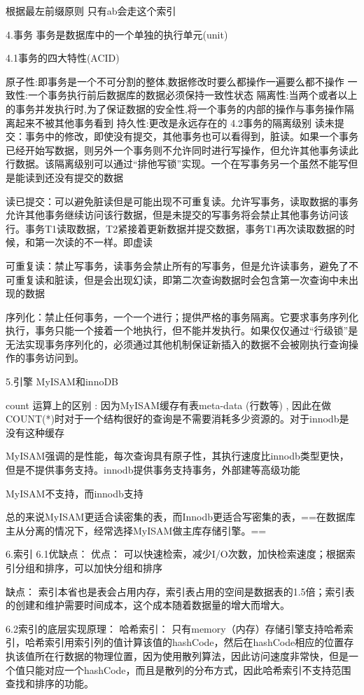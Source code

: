 \documentclass[UTF8]{ctexart}
\begin{document}
根据最左前缀原则 只有ab会走这个索引

4.事务
事务是数据库中的一个单独的执行单元(unit)

4.1事务的四大特性(ACID)

原子性:即事务是一个不可分割的整体,数据修改时要么都操作一遍要么都不操作
一致性:一个事务执行前后数据库的数据必须保持一致性状态
隔离性:当两个或者以上的事务并发执行时,为了保证数据的安全性,将一个事务的内部的操作与事务操作隔离起来不被其他事务看到
持久性:更改是永远存在的
4.2事务的隔离级别
读未提交：事务中的修改，即使没有提交，其他事务也可以看得到，脏读。如果一个事务已经开始写数据，则另外一个事务则不允许同时进行写操作，但允许其他事务读此行数据。该隔离级别可以通过“排他写锁”实现。一个在写事务另一个虽然不能写但是能读到还没有提交的数据

读已提交：可以避免脏读但是可能出现不可重复读。允许写事务，读取数据的事务允许其他事务继续访问该行数据，但是未提交的写事务将会禁止其他事务访问该行。事务T1读取数据，T2紧接着更新数据并提交数据，事务T1再次读取数据的时候，和第一次读的不一样。即虚读

可重复读：禁止写事务，读事务会禁止所有的写事务，但是允许读事务，避免了不可重复读和脏读，但是会出现幻读，即第二次查询数据时会包含第一次查询中未出现的数据

序列化：禁止任何事务，一个一个进行；提供严格的事务隔离。它要求事务序列化执行，事务只能一个接着一个地执行，但不能并发执行。如果仅仅通过“行级锁”是无法实现事务序列化的，必须通过其他机制保证新插入的数据不会被刚执行查询操作的事务访问到。

5.引擎
MyISAM和innoDB

count 运算上的区别 : 因为MyISAM缓存有表meta-data (行数等) , 因此在做COUNT(*)时对于一个结构很好的查询是不需要消耗多少资源的。对于innodb是没有这种缓存

MyISAM强调的是性能，每次查询具有原子性，其执行速度比innodb类型更快，但是不提供事务支持。innodb提供事务支持事务，外部建等高级功能

MyISAM不支持，而innodb支持

总的来说MyISAM更适合读密集的表，而Innodb更适合写密集的表，==在数据库主从分离的情况下，经常选择MyISAM做主库存储引擎。==

6.索引
6.1优缺点：
优点： 可以快速检索，减少I/O次数，加快检索速度；根据索引分组和排序，可以加快分组和排序

缺点： 索引本省也是表会占用内存，索引表占用的空间是数据表的1.5倍；索引表的创建和维护需要时间成本，这个成本随着数据量的增大而增大。

6.2索引的底层实现原理：
哈希索引：
只有memory（内存）存储引擎支持哈希索引，哈希索引用索引列的值计算该值的hashCode，然后在hashCode相应的位置存执该值所在行数据的物理位置，因为使用散列算法，因此访问速度非常快，但是一个值只能对应一个hashCode，而且是散列的分布方式，因此哈希索引不支持范围查找和排序的功能。
\end{document}
